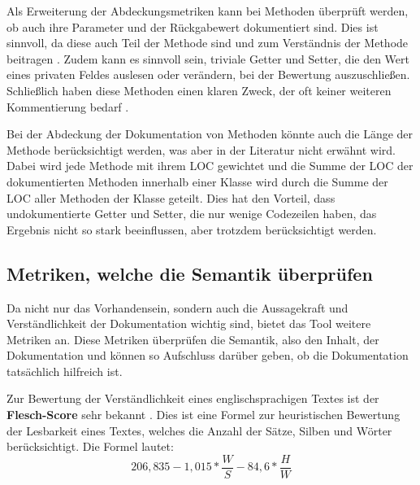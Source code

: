 Als Erweiterung der Abdeckungsmetriken kann bei Methoden überprüft werden, ob auch ihre Parameter und der Rückgabewert dokumentiert sind. Dies ist sinnvoll, da diese auch Teil der Methode sind und zum Verständnis der Methode beitragen \cite[S.~5]{HowDocumentationEvolvesoverTime}. Zudem kann es sinnvoll sein, triviale Getter und Setter, die den Wert eines privaten Feldes auslesen oder verändern, bei der Bewertung auszuschließen. Schließlich haben diese Methoden einen klaren Zweck, der oft keiner weiteren Kommentierung bedarf \cite[S.~254]{JavadocViolationsandTheirEvolutioninOpen-SourceSoftware}.

Bei der Abdeckung der Dokumentation von Methoden könnte auch die Länge der Methode berücksichtigt werden, was aber in der Literatur nicht erwähnt wird. Dabei wird jede Methode mit ihrem \ac{LOC} gewichtet und die Summe der \ac{LOC} der dokumentierten Methoden innerhalb einer Klasse wird durch die Summe der \ac{LOC} aller Methoden der Klasse geteilt. Dies hat den Vorteil, dass undokumentierte Getter und Setter, die nur wenige Codezeilen haben, das Ergebnis nicht so stark beeinflussen, aber trotzdem berücksichtigt werden. 


\subsection{Metriken, welche die Semantik überprüfen}\label{chapter:metrics_semantic}

Da nicht nur das Vorhandensein, sondern auch die Aussagekraft und Verständlichkeit der Dokumentation wichtig sind, bietet das Tool weitere Metriken an. Diese Metriken überprüfen die Semantik, also den Inhalt, der Dokumentation und können so Aufschluss darüber geben, ob die Dokumentation tatsächlich hilfreich ist. 

Zur Bewertung der Verständlichkeit eines englischsprachigen Textes ist der \textbf{Flesch-Score} sehr bekannt \cite[S.~21]{ThePrinciplesofReadability}. Dies ist eine Formel zur heuristischen Bewertung der Lesbarkeit eines Textes, welches die Anzahl der Sätze, Silben und Wörter berücksichtigt. Die Formel lautet:
\begin{equation}
   206,835-1,015*\frac{W}{S}-84,6*\frac{H}{W}
\end{equation}

